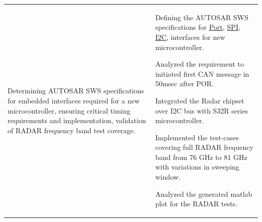 \vspace{-\topsep}\vspace{2pt}    %
\begingroup
\setlength{\tabcolsep}{5pt} %
\indent\begin{tabularx}{\textwidth}{p{} p{\RIGHTCOLUMNWIDTH}} %
      Determining AUTOSAR SWS specifications for embedded interfaces required for a new microcontroller, ensuring critical timing requirements and implementation, validation of RADAR frequency band test coverage.
         &
        \vspace{-\topsep}\vspace{2pt} \begin{myitemize}
         \footnotesize {
            \item \noindent Defining the AUTOSAR SWS specifications for
                           \href{https://www.autosar.org/fileadmin/standards/R22-11/CP/AUTOSAR_SWS_PortDriver.pdf}{Port},
                           \href{https://www.autosar.org/fileadmin/standards/R22-11/CP/AUTOSAR_SWS_SPIHandlerDriver.pdf}{SPI},
                           \href{https://www.autosar.org/fileadmin/standards/R24-11/CP/AUTOSAR_CP_SWS_I2CDriver.pdf}{I2C},
                           interfaces for new microcontroller.
            \item \noindent Analyzed the requirement to initiated first CAN message in 50msec after POR.
            \item \noindent Integrated the Radar chipset over I2C bus with S32R series microcontroller.
            \item \noindent Implemented the test-cases covering full RADAR frequency band from 76 GHz to 81 GHz with variations in sweeping window.
            \item \noindent Analyzed the generated matlab plot for the RADAR tests.
            }
         \end{myitemize}\vspace{-\topsep}%
\vspace{-5pt}%
\end{tabularx}
